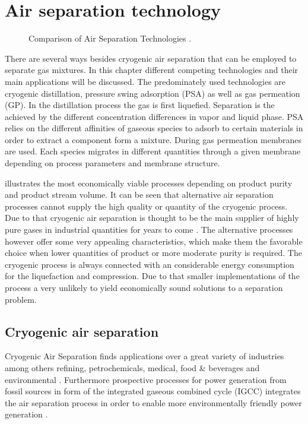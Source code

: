 \chapter{Air separation technology}
\label{chp:airsep}
\begin{figure}[h]
	
	\caption{Comparison of Air Separation Technologies \cite{Prasad.1994}.}
	\label{fig:tech_compar}
\end{figure}

There are several ways besides cryogenic air separation that can be employed to separate gas mixtures. 
In this chapter different competing technologies and their main applications will be discussed. The 
predominately used technologies are cryogenic distillation, pressure swing adsorption (PSA) as well as 
gas permeation (GP). In the distillation process the gas is first liquefied. Separation is the achieved 
by the different concentration differences in vapor and liquid phase. PSA relies on the different affinities 
of gaseous species to adsorb to certain materials in order to extract a component form a mixture. During gas 
permeation membranes are used. Each species migrates in different quantities through a given membrane
depending on process parameters and membrane structure. 

 illustrates the most economically viable processes depending on product
purity and product stream volume. It can be seen that alternative air separation processes 
cannot supply the high quality or quantity of the cryogenic process. Due to that cryogenic air separation is 
thought to be the main supplier of highly pure gases in industrial quantities for years to come 
\cite{Castle.2002}. 
The alternative processes however offer some very appealing characteristics, which make them the 
favorable choice when lower quantities of product or more moderate purity is required. The cryogenic 
process is always connected with an considerable energy consumption for the liquefaction and compression. 
Due to that smaller implementations of the process a very unlikely to yield economically sound solutions
to a separation problem. 

\addref

\section{Cryogenic air separation}
\label{sec:cryo_air_sep}
Cryogenic Air Separation finds applications over a great variety of industries among others refining, petrochemicals, medical, food \& beverages and environmental \cite{Sirdeshpande.2005}. Furthermore 
prospective processes for power generation from fossil sources in form of the integrated gaseous combined 
cycle (IGCC) integrates the air separation process in order to enable more environmentally friendly power 
generation \cite{Mahapatra.2010}. 

